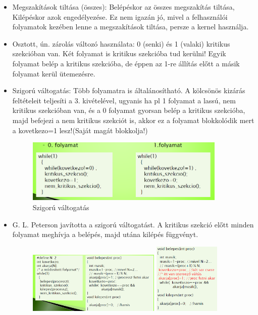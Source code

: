 \documentclass[margin=0px]{article}
\begin{document}
\begin{itemize}
    \item Megszakítások tiltása (összes): Belépéskor az összes megszakítás tiltása, Kilépéskor azok engedélyezése. Ez nem igazán jó, mivel a felhasználói folyamatok kezében lenne a megszakítások tiltása, persze a kernel használja.
    \item Osztott, ún. zárolás változó használata: 0 (senki) és 1 (valaki) kritikus szekcióban van. Két folyamat is kritikus szekcióba tud kerülni! Egyik folyamat belép a kritikus szekcióba, de éppen az 1-re állítás előtt a másik folyamat kerül ütemezésre.
    \item Szigorú váltogatás: Több folyamatra is általánosítható. A kölcsönös kizárás feltételeit teljesíti a 3. kivételével, ugyanis ha pl 1 folyamat a lassú, nem kritikus szekcióban van, és a 0 folyamat gyorsan belép a kritikus szekcióba, majd befejezi a nem kritikus szekciót is, akkor ez a folyamat blokkolódik mert a kovetkezo=1 lesz!(Saját magát blokkolja!)
          \begin{figure}[H]
              \centering
              \includegraphics[width=0.9\textwidth]{img/szigoru.png}
              \caption{Szigorú váltogatás}
          \end{figure}
    \item G. L. Peterson javította a szigorú váltogatást. A kritikus szekció előtt minden folyamat meghívja a belépés, majd utána kilépés függvényt.
          \begin{figure}[H]
              \centering
              \includegraphics[width=0.6\textwidth]{img/peterson.png}
              \includegraphics[width=0.3\textwidth]{img/petersonhiba.png}

\end{figure}
\end{itemize}
\end{document}
